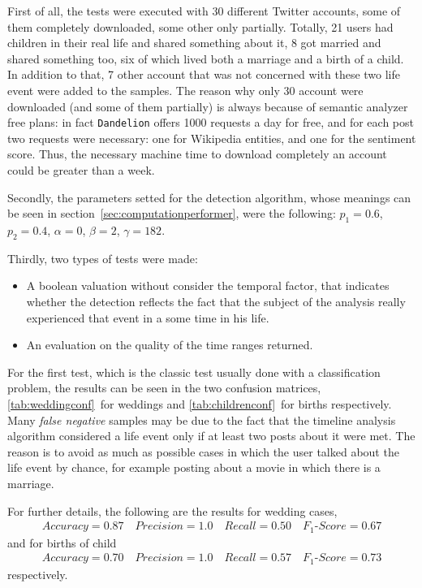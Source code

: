 First of all, the tests were executed with 30 different Twitter accounts, some of them completely downloaded, some other only partially. Totally, 21 users had children in their real life and shared something about it, 8 got married and shared something too, six of which lived both a marriage and a birth of a child. In addition to that, 7 other account that was not concerned with these two life event were added to the samples. The reason why only 30 account were downloaded (and some of them partially) is always because of semantic analyzer free plans: in fact \texttt{Dandelion} offers 1000 requests a day for free, and for each post two requests were necessary: one for Wikipedia entities, and one for the sentiment score. Thus, the necessary machine time to download completely an account could be greater than a week.

Secondly, the parameters setted for the detection algorithm, whose meanings can be seen in section~\ref{sec:computationperformer}, were the following: $p_1 = 0.6$, $p_2 = 0.4$, $\alpha = 0$, $ \beta = 2$, $ \gamma = 182$.

Thirdly, two types of tests were made:
\begin{itemize}
\item A boolean valuation without consider the temporal factor, that indicates whether the detection reflects the fact that the subject of the analysis really experienced that event in a some time in his life.
\item An evaluation on the quality of the time ranges returned.
\end{itemize}
For the first test, which is the classic test usually done with a classification problem, the results can be seen in the two confusion matrices, \ref{tab:weddingconf}~for weddings and \ref{tab:childrenconf}~for births respectively. Many \emph{false negative} samples may be due to the fact that the timeline analysis algorithm considered a life event only if at least two posts about it were met. The reason is to avoid as much as possible cases in which the user talked about the life event by chance, for example posting about a movie in which there is a marriage.

For further details, the following are the results for wedding cases,
\begin{gather}
Accuracy = 0.87 \quad Precision = 1.0 \quad Recall = 0.50 \quad F_1\text{-}Score = 0.67
\label{weddingconfdata}
\end{gather}
and for births of child
\begin{gather}
Accuracy = 0.70 \quad Precision = 1.0 \quad Recall = 0.57 \quad F_1\text{-}Score = 0.73
\label{childrenconfdata}
\end{gather}
respectively.

